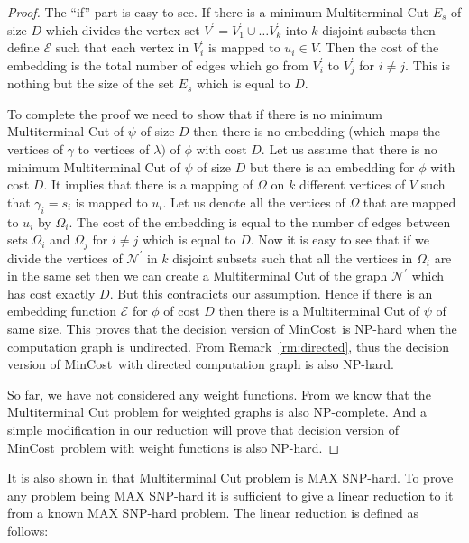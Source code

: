 \documentclass[journal]{IEEEtran}
\newcommand{\net}{\mathcal{N}}
\newcommand{\netnodes}{V}
\newcommand{\netedges}{E}
\newcommand{\compnodes}{\Omega}
\newcommand{\mincost}{\textsf{MinCost}}
\newcommand{\embedding}{\mathcal{E}}
\begin{document}
\begin{proof}
  The ``if'' part is easy to see. If there is a minimum Multiterminal
  Cut $\netedges_s$ of size $D$ which divides the vertex set
  $\netnodes^{\prime} = \netnodes_1^{\prime} \cup \ldots
  \netnodes_k^{\prime}$ into $k$ disjoint subsets then define
  $\embedding$ such that each vertex in $\netnodes_i^{\prime}$ is
  mapped to $u_i \in \netnodes.$ Then the cost of the embedding is the
  total number of edges which go from $\netnodes_i^{\prime}$ to
  $\netnodes_j^{\prime}$ for $i \neq j.$ This is nothing but the size
  of the set $\netedges_s$ which is equal to $D.$

  To complete the proof we need to show that if there is no minimum
  Multiterminal Cut of $\psi$ of size $D$ then there is no embedding
  (which maps the vertices of $\gamma$ to vertices of $\lambda)$ of
  $\phi$ with cost $D.$ Let us assume that there is no minimum
  Multiterminal Cut of $\psi$ of size $D$ but there is an embedding
  for $\phi$ with cost $D.$ It implies that there is a mapping of
  $\compnodes$ on $k$ different vertices of $\netnodes$ such that
  $\gamma_i=s_i$ is mapped to $u_i.$ Let us denote all the vertices of
  $\compnodes$ that are mapped to $u_i$ by $\compnodes_i.$ The cost of
  the embedding is equal to the number of edges between sets
  $\compnodes_i$ and $\compnodes_j$ for $i \neq j$ which is equal to
  $D.$ Now it is easy to see that if we divide the vertices of
  $\net^{\prime}$ in $k$ disjoint subsets such that all the vertices
  in $\compnodes_i$ are in the same set then we can create a
  Multiterminal Cut of the graph $\net^{\prime}$ which has cost
  exactly $D.$ But this contradicts our assumption. Hence if there is
  an embedding function $\embedding$ for $\phi$ of cost $D$ then there
  is a Multiterminal Cut of $\psi$ of same size. This proves that the
  decision version of \mincost\ is NP-hard when the computation graph
  is undirected. From Remark~\ref{rm:directed}, thus the decision
  version of \mincost\ with directed computation graph is also
  NP-hard.

  So far, we have not considered any weight functions. From
  \cite{Dahlhaus94} we know that the Multiterminal Cut problem for
  weighted graphs is also NP-complete. And a simple modification in
  our reduction will prove that decision version of \mincost\ problem
  with weight functions is also NP-hard.
\end{proof}

It is also shown in \cite{Dahlhaus94} that Multiterminal Cut problem
is MAX SNP-hard. To prove any problem being MAX SNP-hard it is
sufficient to give a linear reduction to it from a known MAX SNP-hard
problem. The linear reduction is defined as follows:
\end{document}
